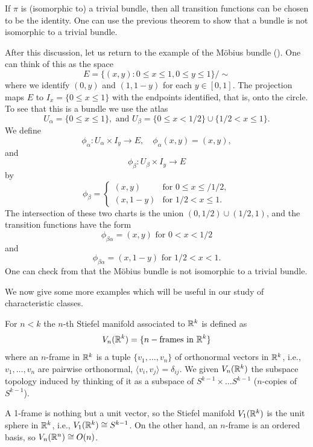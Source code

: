 \documentclass[ma3408.tex]{subfiles}
\begin{document}
\begin{Rem}\label{rem:not_a_trivial_bundle}
If $\pi$ is (isomorphic to) a trivial bundle, then all transition functions can be chosen to be the identity. One can use the previous theorem to show that a bundle is not isomorphic to a trivial bundle. 
\end{Rem}
\begin{Exa}\label{exa:mobius2}
After this discussion, let us return to the example of the M{\"o}bius bundle (). One can think of this as the space
\[
E = \{(x,y) \colon 0 \le x \le 1, 0 \le y \le 1 \}/\sim
\]
where we identify $(0,y)$ and $(1,1-y)$ for each $y \in [0,1]$. The projection maps $E$ to $I_x =\{ 0 \le x \le 1\}$ with the endpoints identified, that is, onto the circle. To see that this is a bundle we use the atlas
\[
U_{\alpha} = \{ 0 \le x \le 1 \}, \text{ and } U_{\beta} = \{ 0 \le x < 1/2\} \cup \{ 1/2 < x \le 1 \}. 
\]
We define
\[
\phi_{\alpha} \colon U_{\alpha} \times I_y \to E, \quad \phi_{\alpha}(x,y) = (x,y), 
\]
and
\[
\phi_{\beta} \colon U_{\beta} \times I_y \to E
\]
by
\[
\phi_{\beta} = \begin{cases}(x,y) & \text{for } 0 \le x \le /1/2, \\ (x,1-y) & \text{for } 1/2 < x \le 1.\end{cases}
\]
The intersection of these two charts is the union $(0,1/2) \cup (1/2,1)$, and the transition functions have the form
\[
\phi_{\beta\alpha} = (x,y) \text{ for } 0 < x < 1/2
\]
and 
\[
\phi_{\beta\alpha} = (x,1-y) \text{ for } 1/2 < x < 1.
\]
One can check from  that the M{\"o}bius bundle is not isomorphic to a trivial bundle. 
\end{Exa}
We now give some more examples which will be useful in our study of characteristic classes. 
\begin{Def}
For $n<k$ the $n$-th Stiefel manifold associated to $\mathbb{R}^k$ is defined as
\[
V_n(\mathbb{R}^k) = \{ n-\text{frames in } \mathbb{R}^k \}
\]
where an $n$-frame in $\mathbb{R}^k$ is a tuple $\{v_1,\ldots,v_n\}$	of orthonormal vectors in $\mathbb{R}^k$, i.e., $v_1,\ldots,v_n$ are pairwise orthonormal, $\langle v_i,v_j \rangle = \delta_{ij}$. We given $V_n(\mathbb{R}^k)$ the subspace topology induced by thinking of it as a subspace of $S^{k-1} \times \ldots S^{k-1}$ ($n$-copies of $S^{k-1}$). 
\end{Def}
\begin{Exa}
A 1-frame is nothing but a unit vector, so the Stiefel manifold $V_1(\mathbb{R}^k)$ is the unit sphere in $\mathbb{R}^k$, i.e., $V_1(\mathbb{R}^k) \cong S^{k-1}$. On the other hand, an $n$-frame is an ordered basis, so $V_n(\mathbb{R}^n) \cong O(n)$. 
\end{Exa}
\end{document}
